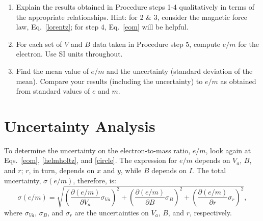 \begin{enumerate}
\item Explain the results obtained in Procedure steps 1-4 qualitatively
in terms of the appropriate relationships. Hint: for 2 \& 3, consider
the magnetic force law, Eq.~\ref{lorentz}; for step 4, Eq.~\ref{eom} will be helpful.

\item For each set of $V$ and $B$ data taken in Procedure step 5, compute $e/m$
for the electron. Use SI units throughout.

\item Find the mean value of $e/m$ and the uncertainty (standard deviation of
the mean). Compare your results (including the uncertainty) to
$e/m$ as obtained from standard values of $e$ and $m$.
\end{enumerate}

\section{Uncertainty Analysis}

To determine the uncertainty on the electron-to-mass ratio, $e/m$, look again at
Eqs.~\ref{eom}, \ref{helmholtz}, and \ref{circle}. The expression for $e/m$
depends on $V_a$, $B$, and $r$; $r$, in turn, depends on $x$ and $y$, while $B$
depends on $I$.
The total uncertainty, $\sigma(e/m)$, therefore, is:
\begin{equation}
\sigma(e/m) = \sqrt{ 
  \left(\frac{\partial(e/m)}{\partial V_a} \sigma_{Va}\right)^2 + 
  \left(\frac{\partial(e/m)}{\partial B} \sigma_B\right)^2 + 
  \left(\frac{\partial(e/m)}{\partial r} \sigma_r\right)^2 },
\label{eq:sigma_eom}
\end{equation}
\noindent where $\sigma_{Va}$, $\sigma_B$, and $\sigma_r$ are the uncertainties
on $V_a$, $B$, and $r$, respectively. 

